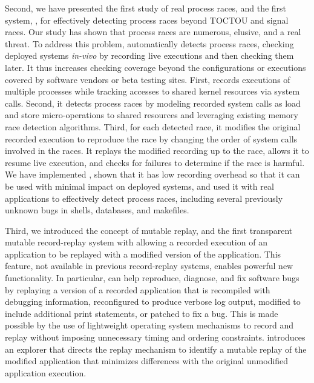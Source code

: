 Second, we have presented the first study of real process races, and the first
system, \racepro, for effectively detecting process races beyond TOCTOU
and signal races. Our study has shown that process races are
numerous, elusive, and a real threat.  To address this problem, \racepro
automatically detects process races, checking deployed
systems \emph{in-vivo} by recording live executions and then checking
them later.  It thus increases checking coverage beyond the
configurations or executions covered by software vendors or beta
testing sites.  First, \racepro records executions of multiple processes
while tracking accesses to shared kernel resources via system
calls. Second, it detects process races by modeling recorded system
calls as load and store micro-operations to shared resources and
leveraging existing memory race detection algorithms.  Third, for each
detected race, it modifies the original recorded execution to
reproduce the race by changing the order of system calls involved in
the races.  It replays the modified recording up to the race, allows
it to resume live execution, and checks for failures to determine if
the race is harmful.  We have implemented \racepro, shown that it has
low recording overhead so that it can be used with minimal impact on
deployed systems, and used it with real applications to effectively
detect \nracepro process races, including several previously unknown
bugs in shells, databases, and makefiles.

Third, we introduced the concept of mutable replay, and the first transparent
mutable record-replay system with \dora allowing a recorded execution of an
application to be replayed with a modified version of the application. This
feature, not available in previous record-replay systems, enables powerful new
functionality. In particular, \dora can help reproduce, diagnose, and fix
software bugs by replaying a version of a recorded application that is
recompiled with debugging information, reconfigured to produce verbose log
output, modified to include additional print statements, or patched to fix a
bug.  This is made possible by the use of lightweight operating system
mechanisms to record and replay without imposing unnecessary timing and ordering
constraints.  \dora introduces an explorer that directs the replay mechanism to
identify a mutable replay of the modified application that minimizes differences
with the original unmodified application execution.

